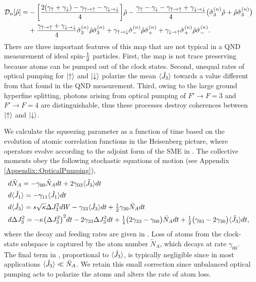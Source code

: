 \documentclass[preprint, aps,pra,onecolumn]{revtex4-1} %
\newcommand{\half}{\smallfrac{1}{2}}
\newcommand{\varz}{\Delta J_3^2}
\newcommand{\jz}{\hat{J}_3}
\newcommand{\NA}{\tilde{N}_A}
\newcommand{\gammauu}{\gamma_{\uparrow \rightarrow \uparrow}}
\newcommand{\gammadd}{\gamma_{\downarrow \rightarrow \downarrow}}
\newcommand{\gammaud}{\gamma_{\uparrow \rightarrow \downarrow}}
\newcommand{\gammadu}{\gamma_{\downarrow \rightarrow \uparrow}}
\newcommand{\gammau}{\gamma_{\uparrow}}
\newcommand{\gammad}{\gamma_{\downarrow}}
\begin{document}
	\begin{align} \label{Eq::OpticalPumpingMapSchr}
		\mathcal{D}_n [\hat{\rho}] 
				=& - \bigg[ \frac{2(\gammau+ \gammad) - \gammauu - \gammadd}{4} \bigg] \hat{\rho} - \frac{ \gammau - \gammad - \gammauu + \gammadd }{4} \big( \hat{\sigma}_3^{(n)} \hat{\rho}+ \hat{\rho} \hat{\sigma}_3^{(n)} \big) \nn \\
		&+ \frac{\gammauu+\gammadd}{4} \hat{\sigma}_ 3^{(n)}\hat{\rho} \hat{\sigma}_3^{(n)} + \gammaud  \hat{\sigma}_-^{(n)} \hat{\rho} \hat{\sigma}_+^{(n)} + \gammadu  \hat{\sigma}_+^{(n)} \hat{\rho} \hat{\sigma}_- ^{(n)}.   
	\end{align} 
There are three important features of this map that are not typical in a QND measurement of ideal spin-$\half$ particles.  
First, the map is not trace preserving because atoms can be pumped out of the clock states. 
Second, unequal rates of optical pumping for $\lvert{\uparrow}\rangle$ and $\lvert{\downarrow}\rangle$ polarize the mean $\expt{\jz}$ towards a value different from that found in the QND measurement. 
Third, owing to the large ground hyperfine splitting, photons arising from optical pumping of $F' \rightarrow F=3$ and $F' \rightarrow F=4$ are distinguishable, thus these processes destroy coherences between $\lvert{\uparrow}\rangle$ and $\lvert{\downarrow}\rangle$. 

We calculate the squeezing parameter as a function of time based on the evolution of atomic correlation functions  in the Heisenberg picture, where operators evolve according to the adjoint form of the SME in .  The collective moments obey the following stochastic equations of motion (see Appendix \ref{Appendix::OpticalPumping}),
	\begin{align} 
		&d \NA = -\gamma_{00} \NA  dt + 2\gamma_{03} \expt{\hat{J}_3} dt \label{Eq::NA}\\
		&d \expt{\hat{J}_1}  = -\gamma_{11} \expt{\hat{J}_1} dt  \label{Eq::MeanSpinDecay} \\
		&d \expt{\hat{J}_3}  = s\sqrt{\kappa} \varz dW -\gamma_{33} \expt{\hat{J}_3}dt + \smallfrac{1}{2}\gamma_{30} \NA dt   \\
		&d \varz  = - \kappa \big(\varz\big)^2 dt- 2 \gamma_{33} \varz dt + \smallfrac{1}{4} \big( 2\gamma_{33}-\gamma_{00} \big) \NA dt + \smallfrac{1}{2} \big( \gamma_{03} - 2 \gamma_{30} \big) \expt{\hat{J}_3} dt,   \label{Eq::varJz} 
	\end{align}
where the decay and feeding rates are given in .
Loss of atoms from the clock-state subspace is captured by the atom number $ \NA $, which decays at rate $\gamma_{00}$. 
The final term in , proportional to $\langle{\hat{J}_3}\rangle$, is typically negligible since in most applications $\expt{\hat{J}_3} \ll \NA$.  
We retain this small correction since unbalanced optical pumping acts to polarize the atoms and alters the rate of atom loss.  
\end{document}
